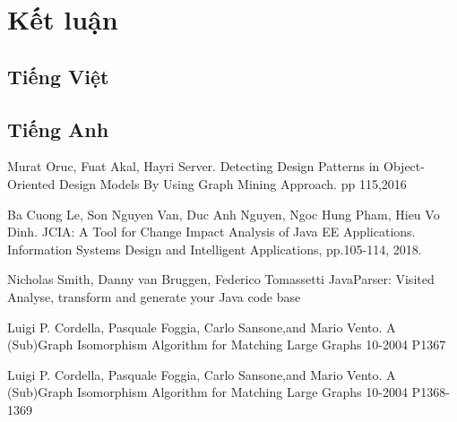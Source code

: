 \documentclass[12pt]{report}
\begin{document}
\chapter{Kết luận}
\begin{thebibliography}{9}
	\section*{Tiếng Việt}
	\section*{Tiếng Anh}
	 Murat Oruc, Fuat Akal, Hayri Server. Detecting Design Patterns in  Object-Oriented Design Models By Using Graph Mining Approach. pp 115,2016
	
	Ba Cuong Le, Son Nguyen Van, Duc Anh Nguyen, Ngoc Hung Pham, Hieu Vo Dinh. JCIA: A Tool for Change Impact Analysis of Java EE Applications. Information Systems Design and Intelligent Applications, pp.105-114, 2018.
	
	Nicholas Smith, Danny van Bruggen, Federico Tomassetti
	JavaParser: Visited
	Analyse, transform and generate your Java code base
	
	Luigi P. Cordella, Pasquale Foggia, Carlo Sansone,and Mario Vento. A (Sub)Graph Isomorphism Algorithm for
	Matching Large Graphs 10-2004 P1367
	
	Luigi P. Cordella, Pasquale Foggia, Carlo Sansone,and Mario Vento. A (Sub)Graph Isomorphism Algorithm for
	Matching Large Graphs 10-2004 P1368-1369
\end{thebibliography}
\end{document}
